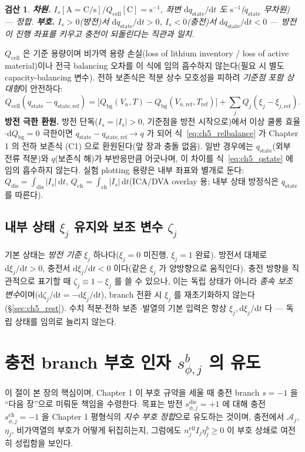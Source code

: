 \documentclass[11pt,a4paper]{article}
\newtheorem*{verifybox}{검산}
\newcommand{\dd}{\mathrm{d}}
\newcommand{\eff}{\mathrm{eff}}
\newcommand{\cell}{\mathrm{cell}}
\newcommand{\bg}{\mathrm{bg}}
\newcommand{\dis}{\mathrm{dis}}
\newcommand{\chg}{\mathrm{ch}}
\newcommand{\stt}{\mathrm{state}}
\begin{document}
\begin{verifybox}
\textbf{차원.} $I_s[\mathrm A=\mathrm{C/s}]/Q_\cell[\mathrm C]=\mathrm{s^{-1}}$, 좌변 $\dd q_\stt/\dd t$ 도
$\mathrm{s^{-1}}$($q_\stt$ 무차원) — 정합. \textbf{부호.} $I_s>0$(방전)서 $\dd q_\stt/\dd t>0$, $I_s<0$(충전)서
$\dd q_\stt/\dd t<0$ — 방전이 진행 좌표를 키우고 충전이 되돌린다는 직관과 일치.
\end{verifybox}

$Q_\cell$ 은 기준 용량이며 비가역 용량 손실(loss of lithium inventory / loss of active material)이나 전극 balancing
오차를 이 식에 임의 흡수하지 않는다(필요 시 별도 capacity-balancing 변수). 전하 보존식은 적분 상수 모호성을 피하려
\emph{기준점 포함 상대형}이 안전하다:
\begin{equation}
Q_\cell(q_\stt-q_{\stt,\mathrm{ref}})=\big[Q_\bg(V_n,T)-Q_\bg(V_{n,\mathrm{ref}},T_{\mathrm{ref}})\big]
+\sum_j Q_j(\xi_j-\xi_{j,\mathrm{ref}}).
\label{eq:ch5_relbalance}
\end{equation}
\textbf{방전 극한 환원.} 방전 단독($I_s=|I_s|>0$, 기준점을 방전 시작으로)에서 이상 쿨롱 효율$\cdot$$\dd Q_\bg=0$
극한이면 $q_\stt-q_{\stt,\mathrm{ref}}\to q$ 가 되어 식~\eqref{eq:ch5_relbalance} 가 Chapter 1 의 전하 보존식 (C1)
으로 환원된다(앞 장과 충돌 없음). 일반 경우에는 $q_\stt$(외부 전류 적분)와 $q$(보존식 해)가 부반응만큼 어긋나며,
이 차이를 식~\eqref{eq:ch5_qstate} 에 임의 흡수하지 않는다. 실험 plotting 용량은 내부 좌표와 별개로 둔다:
$Q_\dis=\int_\dis|I_s|\,\dd t$, $Q_\chg=\int_\chg|I_s|\,\dd t$(ICA/DVA overlay 용; 내부 상태 방정식은 $q_\stt$ 를
따른다).

\subsection{내부 상태 $\xi_j$ 유지와 보조 변수 $\zeta_j$}\label{sec:ch5_xikeep}
기본 상태는 \emph{방전 기준} $\xi_j$ 하나다($\xi_j=0$ 미진행, $\xi_j=1$ 완료). 방전서 대체로 $\dd\xi_j/\dd t>0$,
충전서 $\dd\xi_j/\dd t<0$ 이다(같은 $\xi_j$ 가 양방향으로 움직인다). 충전 방향을 직관적으로 표기할 때
$\zeta_j\equiv1-\xi_j$ 를 쓸 수 있으나, 이는 독립 상태가 아니라 \emph{종속 보조 변수}이며($\dd\zeta_j/\dd t=
-\dd\xi_j/\dd t$), branch 전환 시 $\xi_j$ 를 재초기화하지 않는다(\S\ref{sec:ch5_rest}). 수치 적분$\cdot$전하 보존
$\cdot$발열의 기본 입력은 항상 $\xi_j,\dd\xi_j/\dd t$ 다 — 독립 상태를 임의로 늘리지 않는다.

\section{충전 branch 부호 인자 $s_{\phi,j}^b$ 의 유도}\label{sec:ch5_chargesign}
이 절이 본 장의 핵심이며, Chapter 1 이 부호 규약을 세울 때 충전 branch $s=-1$ 을 ``다음 장''으로 미뤄둔 책임을
수령한다. 목표는 방전 $s_{\phi,j}^\dis=+1$ 에 대해 충전 $s_{\phi,j}^\chg=-1$ 을 Chapter 1 평형식의 \emph{지수 부호
정합}으로 유도하는 것이며, 충전에서 $\mathcal A_j$, $\eta_j$, 비가역열의 부호가 어떻게 뒤집히는지, 그럼에도
$n_j^{\eff}I_j\eta_j^b\ge0$ 이 부호 상쇄로 여전히 성립함을 보인다.
\end{document}
